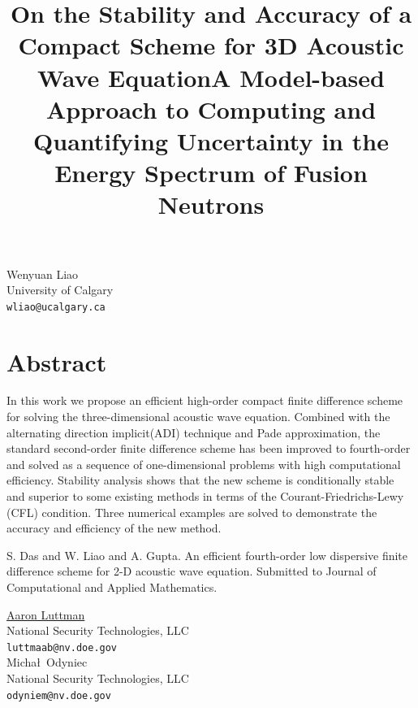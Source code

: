 \documentclass[article,A4,11pt]{llncs}%
\begin{document}
\title{On the Stability and Accuracy of a Compact Scheme for 3D Acoustic Wave Equation}
 \author{} \institute{}
\maketitle
\begin{center}
{\large Wenyuan Liao}\\
University of Calgary\\
{\tt wliao@ucalgary.ca}
\end{center}

\section*{Abstract}
In this work we propose an efficient high-order compact finite difference scheme for solving the three-dimensional acoustic wave equation.
Combined with the alternating direction implicit(ADI) technique and Pade approximation, the standard second-order finite difference scheme has been improved to fourth-order and solved as a sequence of one-dimensional problems with high computational efficiency. Stability analysis shows that the new scheme is conditionally stable  and superior to some existing methods in terms of the Courant-Friedrichs-Lewy (CFL) condition. Three numerical examples are solved to demonstrate the accuracy and efficiency of the new method.


\begin{thebibliography}{10}
{\sc S. Das and W. Liao and A. Gupta}. {An efficient fourth-order low dispersive finite difference scheme for  2-D acoustic wave equation}. Submitted to Journal of Computational and Applied Mathematics.
\end{thebibliography}

\title{A Model-based Approach to Computing and Quantifying Uncertainty in the Energy Spectrum of Fusion Neutrons}
 \author{} \institute{}
\maketitle
\begin{center}
{\large \underline{Aaron Luttman}}\\
National Security Technologies, LLC\\
{\tt luttmaab@nv.doe.gov}
\\ \vspace{4mm}
{\large Micha\l\, Odyniec}\\
National Security Technologies, LLC\\
{\tt odyniem@nv.doe.gov}
\end{center}
\end{document}
